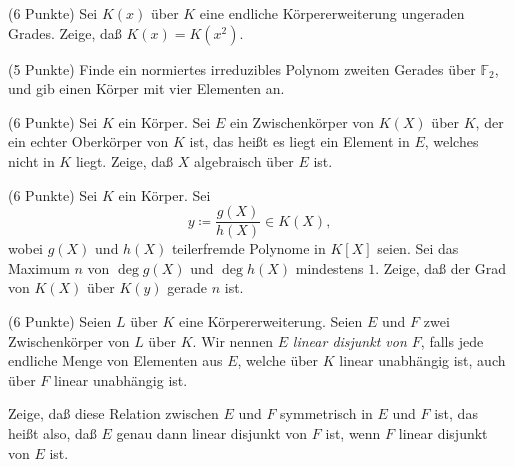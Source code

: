 \documentclass{algsheet}
\author{Dipl.-Math.~Franz Vogler}
\date{11.~Juli 2011}
\begin{document}
                \maketitle



\begin{exercise}(6 Punkte)\newline
    Sei \(K(x)\) über \(K\) eine endliche Körpererweiterung ungeraden Grades.
    Zeige, daß \(K(x) = K(x^2)\).
\end{exercise}

\begin{exercise}(5 Punkte)\newline
    Finde ein normiertes irreduzibles Polynom zweiten Gerades über \(\mathbb F_2\),
    und gib einen Körper mit vier Elementen an.
\end{exercise}

\begin{exercise}(6 Punkte)\newline
    Sei \(K\) ein Körper.
    Sei \(E\) ein Zwischenkörper von \(K(X)\) über \(K\), der ein echter
    Oberkörper von \(K\) ist, das heißt es liegt ein Element in \(E\), welches
    nicht in \(K\) liegt. Zeige, daß \(X\) algebraisch über \(E\) ist.
\end{exercise}

\begin{exercise}(6 Punkte)\newline
    Sei \(K\) ein Körper. Sei
    \begin{equation}
        y \coloneqq \frac{g(X)}{h(X)} \in K(X),
    \end{equation}
    wobei \(g(X)\) und \(h(X)\) teilerfremde Polynome in \(K[X]\) seien. Sei
    das Maximum \(n\) von \(\deg g(X)\) und \(\deg h(X)\) mindestens \(1\). Zeige,
    daß der Grad von \(K(X)\) über \(K(y)\) gerade \(n\) ist.
\end{exercise}

\begin{exercise}(6 Punkte)\newline
    Seien \(L\) über \(K\) eine Körpererweiterung. Seien \(E\) und \(F\) zwei
    Zwischenkörper von \(L\) über \(K\). Wir nennen \(E\) \emph{linear disjunkt
    von \(F\)}, falls jede endliche Menge von Elementen aus \(E\), welche über
    \(K\) linear unabhängig ist, auch über \(F\) linear unabhängig ist.
    
    Zeige, daß diese Relation zwischen \(E\) und \(F\) symmetrisch in \(E\) und
    \(F\) ist, das heißt also, daß \(E\) genau dann linear disjunkt von \(F\) ist,
    wenn \(F\) linear disjunkt von \(E\) ist.
\end{exercise}
\end{document}
